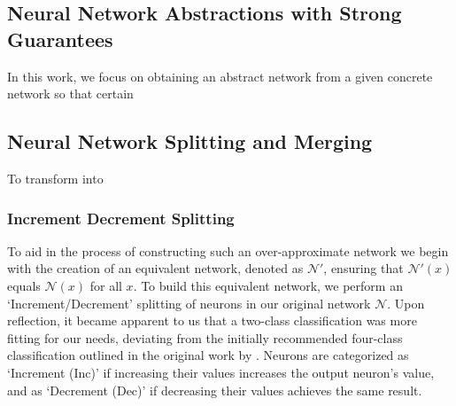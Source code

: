 \subsection{Neural Network Abstractions with Strong Guarantees}

In this work, we focus on obtaining an abstract network \abs from a given
concrete network \cnc so that certain 

\subsection{Neural Network Splitting and Merging}


To transform \cnc into \abs 


\subsubsection{Increment Decrement Splitting}
To aid in the process of constructing such an over-approximate network 
we begin with the creation of an equivalent network, denoted as $\mathcal{N}'$,
 ensuring that $\mathcal{N'}(x)$ equals $\mathcal{N}(x)$ for all $x$.
To build this equivalent network, we perform an `Increment/Decrement'
splitting of neurons in our original network $\mathcal{N}$. Upon reflection, 
it became apparent to us that a two-class classification was more fitting for 
our needs, deviating from the initially recommended four-class classification 
outlined in the original work by \cite{cegar-nn}. Neurons are categorized as 
`Increment (Inc)' if increasing their values increases the output neuron's value,
 and as `Decrement (Dec)' if decreasing their values achieves the same result.

